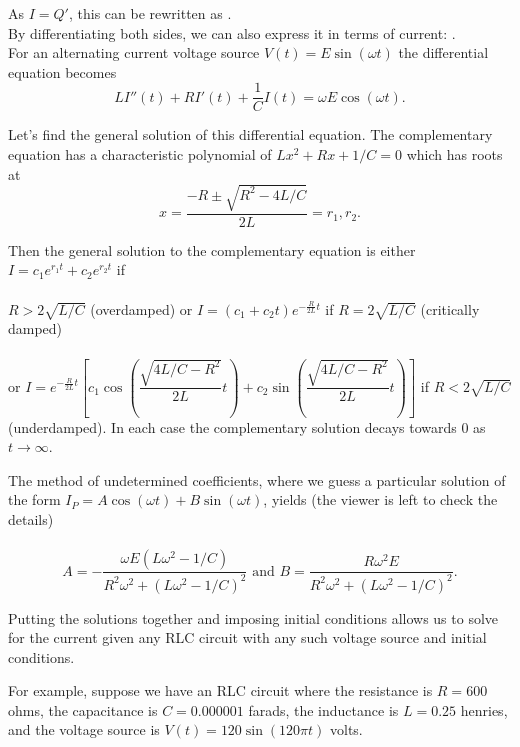\documentclass{ximera}
\begin{document}
 As $I=Q'$, this can be rewritten as .\\

By differentiating both sides, we can also express it in terms of current:  .\\



 For an alternating current voltage source $V (t) = E \sin{(\omega t)}$ the differential equation becomes
 $$ LI''(t) + RI'(t) + \dfrac{1}{C}I(t) = \omega E\cos{(\omega t)}.$$


\bigskip

 Let's find the general solution of this differential equation.  The complementary equation has a characteristic polynomial of $Lx^{2}+Rx+1/C=0$  which has roots at $$x=\dfrac{-R\pm \sqrt{R^{2}-4L/C}}{2L}=r_{1},r_{2}.$$

\bigskip

 Then the general solution to the complementary equation is either $I=c_{1}e^{r_{1}t}+c_{2}e^{r_{2}t}$ if  \\ \\$R> 2\sqrt{L/C}$ (overdamped)   or $I=(c_{1}+c_{2}t)e^{-\frac{R}{2L}t}$ if $R= 2\sqrt{L/C}$ (critically damped) \\  \\  or $I=e^{-\frac{R}{2L}t}\left[c_{1}\cos{\left(\dfrac{\sqrt{4L/C-R^{2}}}{2L}t\right)}+c_{2}\sin{\left(\dfrac{\sqrt{4L/C-R^{2}}}{2L}t\right)}\right]$ if $R< 2\sqrt{L/C}$ (underdamped).   In each case the complementary solution decays towards $0$ as $t\rightarrow \infty$.

\bigskip


 The method of undetermined coefficients, where we guess a particular solution of the form $I_{P}=A\cos{(\omega t)}+B\sin{(\omega t)}$,  yields (the viewer is left to check the details) \\ \\  $$A=-\dfrac{\omega E(L\omega^{2}-1/C)}{R^{2}\omega^{2}+(L\omega^{2}-1/C)^{2}}\mbox{ and }B=\dfrac{R\omega^{2} E}{R^{2}\omega^{2}+(L\omega^{2}-1/C)^{2}}.$$

\bigskip

 Putting the solutions together and imposing initial conditions allows us to solve for the current given any RLC circuit with any such voltage source and initial conditions.

\vspace{1cm}

 For example, suppose we have an RLC circuit where the resistance is $R=600$ ohms, the capacitance is $C=0.000001$ farads, the inductance is $L=0.25$ henries, and the voltage source is $V(t)=120\sin{(120\pi t)}$ volts.
\end{document}
